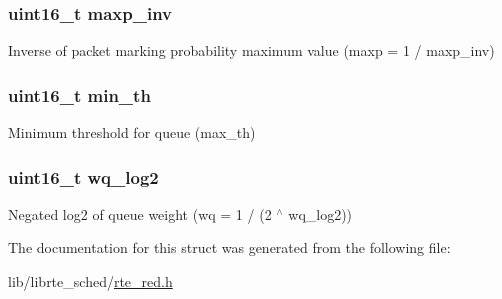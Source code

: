 \subsubsection[{maxp\+\_\+inv}]{\setlength{\rightskip}{0pt plus 5cm}uint16\+\_\+t maxp\+\_\+inv}\label{structrte__red__params_aed8a08ae7a4987eb9ab79cbc9571b3d1}
Inverse of packet marking probability maximum value (maxp = 1 / maxp\+\_\+inv) \hypertarget{structrte__red__params_a8e992dc2fb3e3d3891b69a86bfb1aef3}{}
\subsubsection[{min\+\_\+th}]{\setlength{\rightskip}{0pt plus 5cm}uint16\+\_\+t min\+\_\+th}\label{structrte__red__params_a8e992dc2fb3e3d3891b69a86bfb1aef3}
Minimum threshold for queue (max\+\_\+th) \hypertarget{structrte__red__params_ab18d7bfce2a3bb2753c647e58da944eb}{}
\subsubsection[{wq\+\_\+log2}]{\setlength{\rightskip}{0pt plus 5cm}uint16\+\_\+t wq\+\_\+log2}\label{structrte__red__params_ab18d7bfce2a3bb2753c647e58da944eb}
Negated log2 of queue weight (wq = 1 / (2 $^\wedge$ wq\+\_\+log2)) 

The documentation for this struct was generated from the following file\+:\begin{DoxyCompactItemize}
\item 
lib/librte\+\_\+sched/\hyperlink{rte__red_8h}{rte\+\_\+red.\+h}\end{DoxyCompactItemize}
